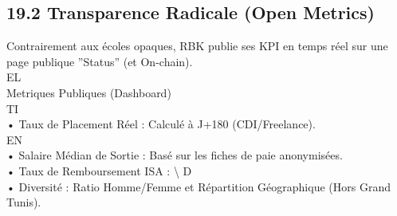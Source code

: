 \subsection{19.2 Transparence Radicale (Open Metrics)}
Contrairement aux écoles opaques, RBK publie ses KPI en temps réel sur une page publique ”Status” (et On-chain).\\
\vspace{0.5em}
\vspace{0.5em}
\vspace{0.5em}
\vspace{0.5em}
EL\\
Metriques Publiques (Dashboard)\\
\vspace{0.5em}
\vspace{0.5em}
\vspace{0.5em}
\vspace{0.5em}
TI\\
• Taux de Placement Réel : Calculé à J+180 (CDI/Freelance).\\
\vspace{0.5em}
\vspace{0.5em}
\vspace{0.5em}
\vspace{0.5em}
EN\\
• Salaire Médian de Sortie : Basé sur les fiches de paie anonymisées.\\
\vspace{0.5em}
• Taux de Remboursement ISA : \textbackslash{}%
\vspace{0.5em}
\vspace{0.5em}
\vspace{0.5em}
\vspace{0.5em}
D\\
• Diversité : Ratio Homme/Femme et Répartition Géographique (Hors Grand Tunis).\\
\vspace{0.5em}
\vspace{0.5em}
\vspace{0.5em}
